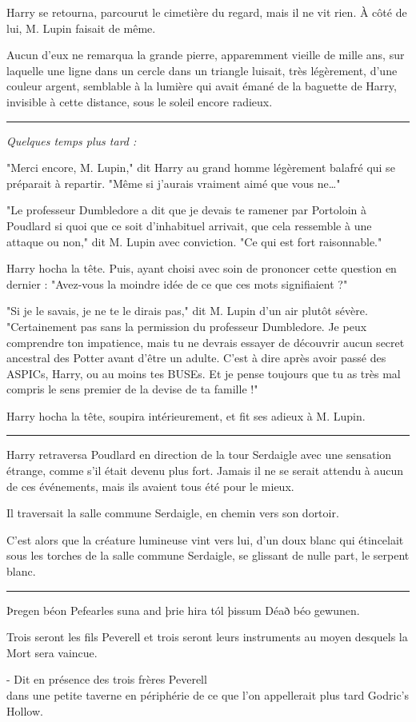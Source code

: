 Harry se retourna, parcourut le cimetière du regard, mais il ne vit rien. À côté de lui, M. Lupin faisait de même.

Aucun d'eux ne remarqua la grande pierre, apparemment vieille de mille ans, sur laquelle une ligne dans un cercle dans un triangle luisait, très légèrement, d'une couleur argent, semblable à la lumière qui avait émané de la baguette de Harry, invisible à cette distance, sous le soleil encore radieux.
\par\noindent\rule{\textwidth}{0.4pt}
\emph{Quelques temps plus tard :} 

"Merci encore, M. Lupin," dit Harry au grand homme légèrement balafré qui se préparait à repartir. "Même si j'aurais vraiment aimé que vous ne…"

"Le professeur Dumbledore a dit que je devais te ramener par Portoloin à Poudlard si quoi que ce soit d'inhabituel arrivait, que cela ressemble à une attaque ou non," dit M. Lupin avec conviction. "Ce qui est fort raisonnable."

Harry hocha la tête. Puis, ayant choisi avec soin de prononcer cette question en dernier : "Avez-vous la moindre idée de ce que ces mots signifiaient ?"

"Si je le savais, je ne te le dirais pas," dit M. Lupin d'un air plutôt sévère. "Certainement pas sans la permission du professeur Dumbledore. Je peux comprendre ton impatience, mais tu ne devrais essayer de découvrir aucun secret ancestral des Potter avant d'être un adulte. C'est à dire après avoir passé des ASPICs, Harry, ou au moins tes BUSEs. Et je pense toujours que tu as très mal compris le sens premier de la devise de ta famille !"

Harry hocha la tête, soupira intérieurement, et fit ses adieux à M. Lupin.
\par\noindent\rule{\textwidth}{0.4pt}
Harry retraversa Poudlard en direction de la tour Serdaigle avec une sensation étrange, comme s'il était devenu plus fort. Jamais il ne se serait attendu à aucun de ces événements, mais ils avaient tous été pour le mieux.

Il traversait la salle commune Serdaigle, en chemin vers son dortoir.

C'est alors que la créature lumineuse vint vers lui, d'un doux blanc qui étincelait sous les torches de la salle commune Serdaigle, se glissant de nulle part, le serpent blanc.
\par\noindent\rule{\textwidth}{0.4pt}

\begin{center}Þregen béon Pefearles suna and þrie hira tól þissum Déað béo gewunen.\end{center}



\begin{center}Trois seront les fils Peverell et trois seront leurs instruments au moyen desquels la Mort sera vaincue.\end{center}



\begin{center}- Dit en présence des trois frères Peverell\\dans une petite taverne en périphérie de ce que l'on appellerait plus tard Godric's Hollow.\end{center}



